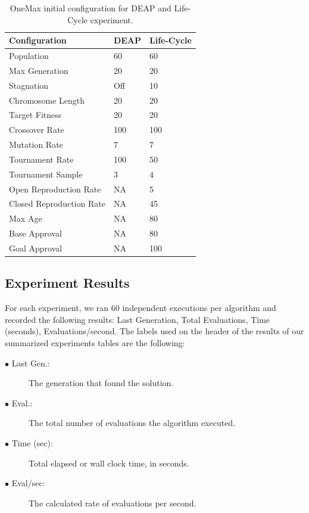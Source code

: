 \documentclass[runningheads]{llncs}
\begin{document}
\begin{table}[]
    \centering        
    \caption{OneMax initial configuration for DEAP and Life-Cycle experiment.}\label{tab1}
    \begin{tabular}{|l|l|l|}
    \hline
    \textbf{Configuration} & \textbf{DEAP} & \textbf{Life-Cycle} \\ \hline
    Population & 60 & 60 \\ \hline
    Max Generation & 20 & 20 \\ \hline
    Stagnation & Off & 10 \\ \hline
    Chromosome Length & 20 & 20 \\ \hline
    Target Fitness & 20 & 20 \\ \hline
    Crossover Rate & 100 & 100 \\ \hline
    Mutation Rate & 7 & 7 \\ \hline
    Tournament Rate & 100 & 50 \\ \hline
    Tournament Sample & 3 & 4 \\ \hline
    Open Reproduction Rate & NA & 5 \\ \hline
    Closed Reproduction Rate & NA & 45 \\ \hline
    Max Age & NA & 80 \\ \hline
    Base Approval & NA & 80 \\ \hline
    Goal Approval & NA & 100 \\ \hline
    \end{tabular}
    \end{table}


\subsection{Experiment Results}

For each experiment, we ran 60 independent executions per algorithm and
recorded the following results: Last Generation, Total Evaluations, Time
(seconds), Evaluations/second. The labels used on the header of the results of
our summarized experiments tables are the following:

\begin{description}  %
    \item[$\bullet$ Last Gen.:] The generation that found the solution.
    \item[$\bullet$ Eval.:] The total number of evaluations the algorithm executed. 
    \item[$\bullet$ Time (sec):] Total elapsed or wall clock time, in seconds. 
    \item[$\bullet$ Eval/sec:] The calculated rate of evaluations per second.
\end{description}
\end{document}
